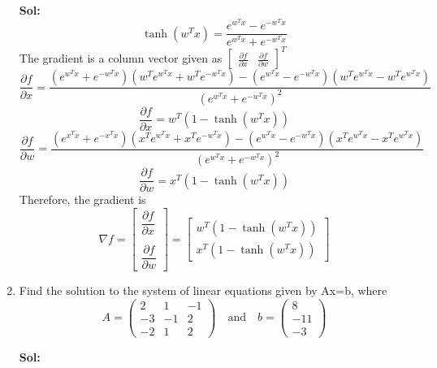 \documentclass[11pt]{article}
\begin{document}
\begin{enumerate}
\textbf{Sol:}
\[\tanh(w^T x) = \frac{e^{w^T x} - e^{-w^T x}}{e^{w^T x} + e^{-w^T x}}\]
The gradient is a column vector given as $\begin{bmatrix}
  \frac{\partial f}{\partial x} & \frac{\partial f}{\partial w}
\end{bmatrix}^T$
\[\frac{\partial f}{\partial x} = \dfrac{(e^{w^T x} + e^{-w^T x})(w^Te^{w^T x} + w^Te^{-w^T x}) - (e^{w^Tx} - e^{-w^T x})(w^Te^{w^Tx} - w^Te^{w^T x})}{(e^{w^T x} + e^{-w^T x})^2}\]
\[\frac{\partial f}{\partial x} = w^T(1 - \tanh(w^T x))\]
\[\frac{\partial f}{\partial w} = \dfrac{(e^{x^T x} + e^{-x^T x})(x^Te^{w^T x} + x^Te^{-w^T x}) - (e^{w^Tx} - e^{-w^T x})(x^Te^{w^Tx} - x^Te^{w^T x})}{(e^{w^T x} + e^{-w^T x})^2}\]
\[\frac{\partial f}{\partial w} = x^T(1 - \tanh(w^Tx))\]
Therefore, the gradient is
\[\nabla f = \begin{bmatrix}
  \dfrac{\partial f}{\partial x} \\ \\ \dfrac{\partial f}{\partial w}
\end{bmatrix} = 
  \begin{bmatrix}
  w^T(1 - \tanh(w^Tx))\\ 
  x^T(1- \tanh(w^Tx))
\end{bmatrix}\]

  \newpage
	   
\item Find the solution to the system of linear equations given by Ax=b, where 
\[A = \left(\begin{array}{rrr} 2 & 1 & -1\\ -3 & -1 & 2 \\ -2 & 1 & 2 \end{array}\right) \quad \text{and} \quad b = \left(\begin{array}{r} 8 \\ -11 \\ -3 \end{array}\right)\]

\textbf{Sol:}


\end{enumerate}
\end{document}
